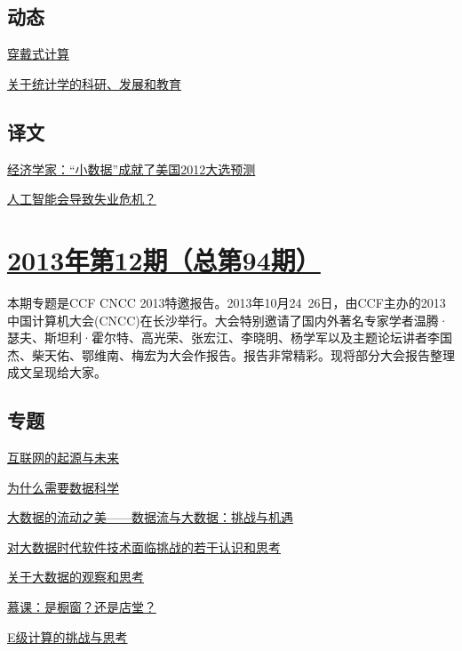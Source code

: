\documentclass[a4paper]{article}
\begin{document}
\subsection{动态}
\href{http://history.ccf.org.cn/resources/1190201776262/2014/01/15/16.pdf}{穿戴式计算}

\href{http://history.ccf.org.cn/resources/1190201776262/2014/01/15/15.pdf}{关于统计学的科研、发展和教育}

\subsection{译文}
\href{http://history.ccf.org.cn/resources/1190201776262/2014/01/15/18.pdf}{经济学家：“小数据”成就了美国2012大选预测}

\href{http://history.ccf.org.cn/resources/1190201776262/2014/01/15/17.pdf}{人工智能会导致失业危机？}


\section{\href{http://history.ccf.org.cn/sites/ccf/jsjtbbd.jsp?contentId=2774275247149}{\textbf{2013年第12期（总第94期）}}}
本期专题是CCF CNCC 2013特邀报告。2013年10月24~26日，由CCF主办的2013中国计算机大会(CNCC)在长沙举行。大会特别邀请了国内外著名专家学者温腾·瑟夫、斯坦利·霍尔特、高光荣、张宏江、李晓明、杨学军以及主题论坛讲者李国杰、柴天佑、鄂维南、梅宏为大会作报告。报告非常精彩。现将部分大会报告整理成文呈现给大家。
\subsection{专题}
\href{http://history.ccf.org.cn/resources/1190201776262/2013/12/16/1.pdf}{互联网的起源与未来}

\href{http://history.ccf.org.cn/resources/1190201776262/2013/12/16/2.pdf}{为什么需要数据科学}

\href{http://history.ccf.org.cn/resources/1190201776262/2013/12/16/3.pdf}{大数据的流动之美——数据流与大数据：挑战与机遇}

\href{http://history.ccf.org.cn/resources/1190201776262/2013/12/16/9.pdf}{对大数据时代软件技术面临挑战的若干认识和思考}

\href{http://history.ccf.org.cn/resources/1190201776262/2013/12/16/4.pdf}{关于大数据的观察和思考}

\href{http://history.ccf.org.cn/resources/1190201776262/2013/12/16/5.pdf}{慕课：是橱窗？还是店堂？}

\href{http://history.ccf.org.cn/resources/1190201776262/2013/12/16/6.pdf}{E级计算的挑战与思考}
\end{document}

